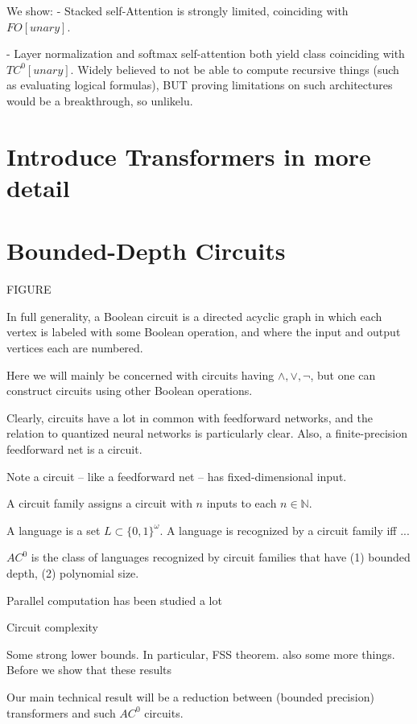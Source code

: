 \documentclass[11pt,a4paper]{article}
\newcounter{theorem}
\begin{document}
We show:
- Stacked self-Attention is strongly limited, coinciding with $FO[unary]$.

- Layer normalization and softmax self-attention both yield class coinciding with $TC^0[unary]$.
Widely believed to not be able to compute recursive things (such as evaluating logical formulas), BUT proving limitations on such architectures would be a breakthrough, so unlikelu.


\section{Introduce Transformers in more detail}

\section{Bounded-Depth Circuits}

FIGURE

In full generality, a Boolean circuit is a directed acyclic graph in which each vertex is labeled with some Boolean operation, and where the input and output vertices each are numbered.

Here we will mainly be concerned with circuits having $\wedge, \vee, \neg$, but one can construct circuits using other Boolean operations.

Clearly, circuits have a lot in common with feedforward networks, and the relation to quantized neural networks is particularly clear.
Also, a finite-precision feedforward net is a circuit.

Note a circuit -- like a feedforward net -- has fixed-dimensional input.

A circuit family assigns a circuit with $n$ inputs to each $n \in \mathbb{N}$.

A language is a set $L \subset \{0,1\}^\omega$.
A language is recognized by a circuit family iff ...

$AC^0$ is the class of languages recognized by circuit families that have (1) bounded depth, (2) polynomial size.





Parallel computation has been studied a lot

Circuit complexity

Some strong lower bounds.
In particular, FSS theorem. also some more things.
Before we show that these results

Our main technical result will be a reduction between (bounded precision) transformers and such $AC^0$ circuits.
\end{document}

